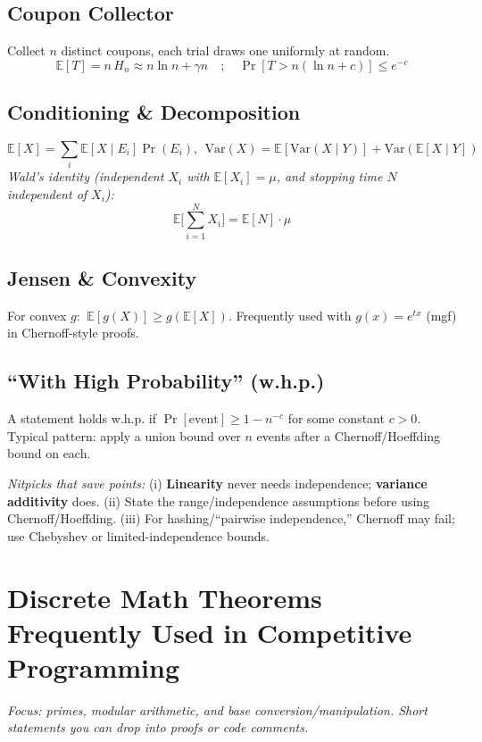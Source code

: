 \documentclass[10pt]{article}
\theoremstyle{definition}
\begin{document}
\subsection{Coupon Collector}
Collect $n$ distinct coupons, each trial draws one uniformly at random.
\[
\mathbb{E}[T]=n\,H_n\approx n\ln n+\gamma n\quad;\quad \Pr\!\left[T>n(\ln n+c)\right]\le e^{-c}
\]

\subsection{Conditioning \& Decomposition}
\[
\mathbb{E}[X]=\sum_{i} \mathbb{E}[X\mid E_i]\Pr(E_i),\ \ \mathrm{Var}(X)=\mathbb{E}[\mathrm{Var}(X\mid Y)]+\mathrm{Var}(\mathbb{E}[X\mid Y])
\]
\emph{Wald’s identity (independent $X_i$ with $\mathbb{E}[X_i]=\mu$, and stopping time $N$ independent of $X_i$): }
\[
\mathbb{E}\Big[\sum_{i=1}^N X_i\Big]=\mathbb{E}[N]\cdot \mu
\]

\subsection{Jensen \& Convexity}
For convex $g$: $\ \mathbb{E}[g(X)]\ge g(\mathbb{E}[X])$. Frequently used with $g(x)=e^{tx}$ (mgf) in Chernoff-style proofs.

\subsection{“With High Probability” (w.h.p.)}
A statement holds w.h.p. if $\Pr[\text{event}]\ge 1 - n^{-c}$ for some constant $c>0$. Typical pattern: apply a union bound over $n$ events after a Chernoff/Hoeffding bound on each.

\smallskip
\noindent\textit{Nitpicks that save points:}
(i) \textbf{Linearity} never needs independence; \textbf{variance additivity} does. 
(ii) State the range/independence assumptions before using Chernoff/Hoeffding. 
(iii) For hashing/“pairwise independence,” Chernoff may fail; use Chebyshev or limited-independence bounds.

\section*{Discrete Math Theorems Frequently Used in Competitive Programming}
\textit{Focus: primes, modular arithmetic, and base conversion/manipulation. Short statements you can drop into proofs or code comments.}
\end{document}
